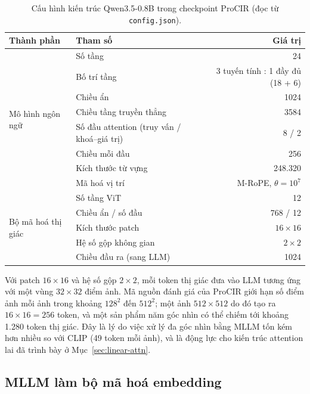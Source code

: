 \begin{table}[h]
\centering
\caption{Cấu hình kiến trúc Qwen3.5-0.8B trong checkpoint ProCIR (đọc từ \texttt{config.json}).}
\label{tab:qwen35-config}
\begin{tabular}{llr}
\toprule
Thành phần & Tham số & Giá trị \\
\midrule
\multirow{8}{*}{Mô hình ngôn ngữ}
 & Số tầng & 24 \\
 & Bố trí tầng & 3 tuyến tính : 1 đầy đủ (18 + 6) \\
 & Chiều ẩn & 1024 \\
 & Chiều tầng truyền thẳng & 3584 \\
 & Số đầu attention (truy vấn / khoá--giá trị) & 8 / 2 \\
 & Chiều mỗi đầu & 256 \\
 & Kích thước từ vựng & 248.320 \\
 & Mã hoá vị trí & M-RoPE, $\theta = 10^7$ \\
\midrule
\multirow{5}{*}{Bộ mã hoá thị giác}
 & Số tầng ViT & 12 \\
 & Chiều ẩn / số đầu & 768 / 12 \\
 & Kích thước patch & $16 \times 16$ \\
 & Hệ số gộp không gian & $2 \times 2$ \\
 & Chiều đầu ra (sang LLM) & 1024 \\
\bottomrule
\end{tabular}
\end{table}

Với patch $16 \times 16$ và hệ số gộp $2 \times 2$, mỗi token thị giác đưa vào LLM tương ứng với một vùng $32 \times 32$ điểm ảnh. Mã nguồn đánh giá của ProCIR giới hạn số điểm ảnh mỗi ảnh trong khoảng $128^2$ đến $512^2$; một ảnh $512 \times 512$ do đó tạo ra $16 \times 16 = 256$ token, và một sản phẩm năm góc nhìn có thể chiếm tới khoảng 1.280 token thị giác. Đây là lý do việc xử lý đa góc nhìn bằng MLLM tốn kém hơn nhiều so với CLIP (49 token mỗi ảnh), và là động lực cho kiến trúc attention lai đã trình bày ở Mục~\ref{sec:linear-attn}.

\subsection{MLLM làm bộ mã hoá embedding}

